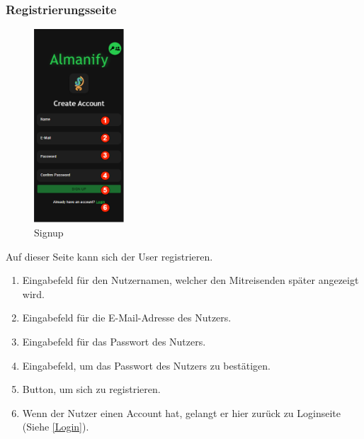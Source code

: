 \subsubsection{Registrierungsseite}\label{Signup}
\begin{figure}[H]
	\centering
	\includegraphics[width=0.3\textwidth]{img/pages_numbers/signup.drawio}
	\caption[Signup]{Signup}
	\label{fig:Signup}
\end{figure}

Auf dieser Seite kann sich der User registrieren.

\begin{enumerate}[label=\protect\circled{\arabic*}]
	\item Eingabefeld für den Nutzernamen, welcher den Mitreisenden später angezeigt wird.
	\item Eingabefeld für die E-Mail-Adresse des Nutzers.
	\item Eingabefeld für das Passwort des Nutzers.
	\item Eingabefeld, um das Passwort des Nutzers zu bestätigen.
	\item Button, um sich zu registrieren.
	\item Wenn der Nutzer einen Account hat, gelangt er hier zurück zu Loginseite (Siehe \ref{Login}).
\end{enumerate}


